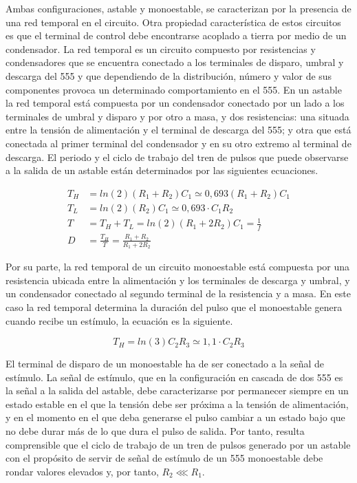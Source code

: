 Ambas configuraciones, astable y monoestable, se caracterizan por la
presencia de una red temporal en el circuito. Otra propiedad característica
de estos circuitos es que el terminal de control debe encontrarse acoplado
a tierra por medio de un condensador. La red temporal es un circuito
compuesto por resistencias y condensadores que se encuentra conectado a los
terminales de disparo, umbral y descarga del 555 y que dependiendo de la
distribución, número y valor de sus componentes provoca un determinado
comportamiento en el 555. En un astable la red temporal está compuesta por
un condensador conectado por un lado a los terminales de umbral y disparo y
por otro a masa, y dos resistencias: una situada entre la tensión de
alimentación y el terminal de descarga del 555; y otra que está conectada
al primer terminal del condensador y en su otro extremo al terminal de
descarga. El periodo y el ciclo de trabajo del tren de pulsos que puede
observarse a la salida de un astable están determinados por las siguientes
ecuaciones.

\begin{align}
	T_H &= ln(2)(R_1 + R_2)C_1 \simeq 0,693(R_1 + R_2)C_1 \\
	T_L &= ln(2)(R_2)C_1 \simeq 0,693\cdot C_1R_2 \\
	T &= T_H + T_L = ln(2)(R_1 + 2R_2)C_1 = \frac{1}{f} \\
	D &= \frac{T_H}{T} = \frac{R_1 + R_2}{R_1 + 2R_2}
	\label{eq:astable}
\end{align}

Por su parte, la red temporal de un circuito monoestable está compuesta por
una resistencia ubicada entre la alimentación y los terminales de descarga
y umbral, y un condensador conectado al segundo terminal de la resistencia
y a masa. En este caso la red temporal determina la duración del pulso que
el monoestable genera cuando recibe un estímulo, la ecuación es la
siguiente.

\begin{equation}
	T_H = ln(3)C_2R_3 \simeq 1,1\cdot C_2R_3
	\label{eq:monostable}
\end{equation}

El terminal de disparo de un monoestable ha de ser conectado a la señal de
estímulo. La señal de estímulo, que en la configuración en cascada de dos
555 es la señal a la salida del astable, debe caracterizarse por permanecer
siempre en un estado estable en el que la tensión debe ser próxima a la
tensión de alimentación, y en el momento en el que deba generarse el pulso
cambiar a un estado bajo que no debe durar más de lo que dura el pulso de
salida. Por tanto, resulta comprensible que el ciclo de trabajo de un tren
de pulsos generado por un astable con el propósito de servir de señal de
estímulo de un 555 monoestable debe rondar valores elevados y, por tanto,
$R_2 \lll R_1$.


